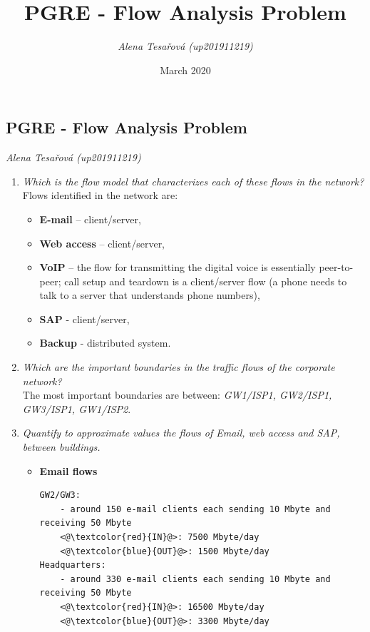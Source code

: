 \documentclass[11pt,a4paper]{article}
\title{PGRE - Flow Analysis Problem}
\author{\textit{Alena Tesařová (up201911219)} }
\date{March 2020}
\begin{document}
\begin{center}
\section*{PGRE - Flow Analysis Problem}
\textit{Alena Tesařová (up201911219)}
\end{center}{}

\begin{enumerate}
    \item \textit{Which is the flow model that characterizes each of these flows in the network?}\\
    Flows identified in the network are:
    \begin{itemize}
        \item \textbf{E-mail }-- client/server,
        \item \textbf{Web access} -- client/server,
         \item \textbf{VoIP} -- the flow for transmitting the digital voice is
essentially peer-to-peer; call setup and teardown is a client/server
flow (a phone needs to talk to a server that understands phone numbers),
         \item \textbf{SAP} - client/server,
          \item \textbf{Backup} - distributed system.
    \end{itemize}{}
    \item\textit{ Which are the important boundaries in the traffic flows of the corporate
network?} \\
The most important boundaries are between: \textit{GW1/ISP1, GW2/ISP1, GW3/ISP1, GW1/ISP2}.
\item \textit{Quantify to approximate values the flows of Email, web access and SAP,
between buildings.}
\begin{itemize}
    \item \textbf{Email flows}
\begin{lstlisting}
GW2/GW3: 
    - around 150 e-mail clients each sending 10 Mbyte and receiving 50 Mbyte
    <@\textcolor{red}{IN}@>: 7500 Mbyte/day
    <@\textcolor{blue}{OUT}@>: 1500 Mbyte/day
Headquarters:
    - around 330 e-mail clients each sending 10 Mbyte and receiving 50 Mbyte
    <@\textcolor{red}{IN}@>: 16500 Mbyte/day
    <@\textcolor{blue}{OUT}@>: 3300 Mbyte/day
\end{lstlisting}

\end{itemize}
\end{enumerate}
\end{document}
